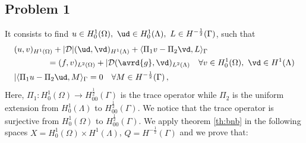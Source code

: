 \subsection{Problem 1}
It consists to find $u \in H^1_0(\Omega),\ \ud \in H_0^1(\Lambda), \ L \in H^{-\frac12}(\Gamma )$, such that
\begin{subequations}\label{eq:red_dirneu}
\begin{align}
&(u,v)_{H^1(\Omega)} + |{\cal D}| (\ud,\vd)_{H^1(\Lambda)} 
+ \langle \Pi_1 v  - \Pi_2 \vd, L \rangle_\Gamma 
\\
\nonumber
&\qquad\qquad= (f,v)_{L^2(\Omega)} + |{\cal D}(\avrd{g},\vd)_{L^2(\Lambda)}
\quad \forall v \in H^1_0(\Omega), \ \vd \in H^1(\Lambda)
\\
&   |\langle \Pi_1 u - \Pi_2 \ud , M \rangle_\Gamma = 0
\quad \forall M \in H^{-\frac12}(\Gamma)\,,
\end{align}
\end{subequations}
Here, $\Pi_1: H^1_0(\Omega) \rightarrow H^{\frac12}_{00}(\Gamma)$ is the trace operator 
while $\Pi_2$ is the uniform extension from $H^1_0(\Lambda)$ to  $H^{\frac12}_{00}(\Gamma)$. 
We notice that the trace operator is surjective from $H^1_0(\Omega)$ to $H^{\frac12}_{00}(\Gamma)$.
We apply theorem \ref{th:bnb} in the following spaces 
$X=H^1_0(\Omega) \times H^1(\Lambda)$, $Q=H^{-\frac 12}(\Gamma)$
and we prove that:

